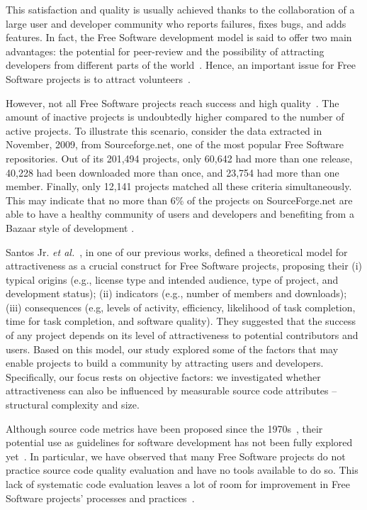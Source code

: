 \documentclass[conference]{IEEEtran}
\begin{document}
This satisfaction and quality is usually achieved thanks to the collaboration
of a large user and developer community who reports failures,
fixes bugs, and adds features.
%
In fact, the Free Software development model is said to offer two main advantages:
the potential for peer-review and the possibility of attracting developers
from different parts of the world~\cite{Michlmayr2005}.
%
Hence, an important issue for Free Software projects is to attract volunteers~\cite{Stewart2006}.

However, not all Free Software projects reach success and high quality~\cite{Michlmayr2005}.
The amount of inactive projects is undoubtedly higher compared to the number of active projects.
%
To illustrate this scenario, consider the data extracted in November, 2009,
from Sourceforge.net, one of the most popular Free Software repositories.
Out of its 201,494 projects, only 60,642 had more than one
release, 40,228 had been downloaded more than once, and 23,754 had more than one member.
%
Finally, only 12,141 projects matched all these criteria simultaneously.
This may indicate that no more than 6\% of the projects on
SourceForge.net are able to have a healthy community of users
and developers and benefiting from a Bazaar style of development
\cite{CatedralBazzar}.

Santos Jr. \emph{et al.}~\cite{Santos2010}, in one of our previous works,
defined a theoretical model for  attractiveness as a crucial construct for
Free Software projects, proposing their
(i) typical origins (e.g., license type and intended audience, type of project,
and development status);
(ii) indicators (e.g., number of members and downloads);
(iii) consequences (e.g, levels of activity, efficiency, likelihood of task
completion, time for task completion, and software quality).
%
They suggested that the success of any project depends on
its level of attractiveness to potential contributors and users.
%
Based on this model, our study explored some of the factors that may enable
projects to build a community by attracting users and developers.
%
Specifically, our focus rests on objective factors: we investigated whether
attractiveness can also be influenced by measurable source code attributes
-- structural complexity and size.

Although source code metrics have been proposed since the 1970s~\cite{SEI88},
their potential use as guidelines for software development has not
been fully explored yet~\cite{Tempero}.
%
In particular, we have observed that many Free Software projects do not practice
source code quality evaluation and have no tools available to do so.
%
This lack of systematic code evaluation leaves a lot of room for improvement
in Free Software projects' processes and practices~\cite{Michlmayr2005}.
\end{document}
